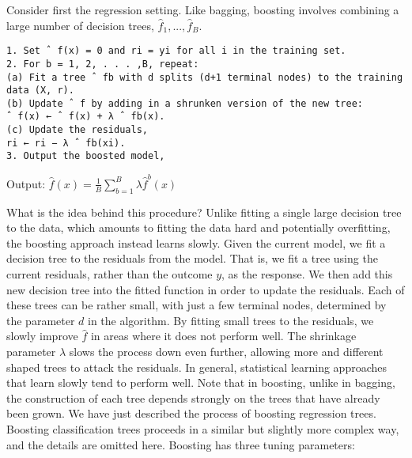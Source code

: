 Consider first the regression setting. Like bagging, boosting involves combining
a large number of decision trees, $\hat{f}_1, ...,  \hat{f}_B$.

\begin{verbatim}
1. Set ˆ f(x) = 0 and ri = yi for all i in the training set.
2. For b = 1, 2, . . . ,B, repeat:
(a) Fit a tree ˆ fb with d splits (d+1 terminal nodes) to the training
data (X, r).
(b) Update ˆ f by adding in a shrunken version of the new tree:
ˆ f(x) ← ˆ f(x) + λ ˆ fb(x).
(c) Update the residuals,
ri ← ri − λ ˆ fb(xi).
3. Output the boosted model,
\end{verbatim}

Output: $\hat{f}(x) = \frac{1}{B} \sum_{b=1}^{B} \lambda \hat{f}^b (x)$


What is the idea behind this procedure? Unlike fitting a single large decision tree to the data,
which amounts to fitting the data hard and potentially overfitting, the boosting approach instead
learns slowly. Given the current model, we fit a decision tree to the residuals from the model. That
is, we fit a tree using the current residuals, rather than the outcome $y$, as the response. We then
add this new decision tree into the fitted function in order to update the residuals. Each of these
trees can be rather small, with just a few terminal nodes, determined by the parameter $d$ in the
algorithm. By fitting small trees to the residuals, we slowly improve $\hat{f}$ in areas where it
does not perform well. The shrinkage parameter $\lambda$ slows the process down even further,
allowing more and different shaped trees to attack the residuals. In general, statistical learning
approaches that learn slowly tend to perform well. Note that in boosting, unlike in bagging, the
construction of each tree depends strongly on the trees that have already been grown. We have just
described the process of boosting regression trees. Boosting classification trees proceeds in a
similar but slightly more complex way, and the details are omitted here. Boosting has three tuning
parameters:

